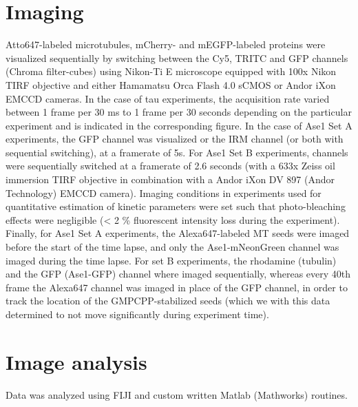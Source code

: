 \section{Imaging}
Atto647-labeled microtubules, mCherry- and mEGFP-labeled proteins were visualized sequentially by switching between the Cy5, TRITC and GFP channels (Chroma filter-cubes) using Nikon-Ti E microscope equipped with 100x Nikon TIRF objective and either Hamamatsu Orca Flash 4.0 sCMOS or Andor iXon EMCCD cameras. In the case of tau experiments, the acquisition rate varied between 1 frame per 30 ms to 1 frame per 30 seconds depending on the particular experiment and is indicated in the corresponding figure. In the case of Ase1 Set A experiments, the GFP channel was visualized or the IRM channel (or both with sequential switching), at a framerate of 5s. For Ase1 Set B experiments, channels were sequentially switched at a framerate of 2.6 seconds (with a 633x Zeiss oil immersion TIRF objective in combination with a Andor iXon DV 897 (Andor Technology) EMCCD camera). Imaging conditions in experiments used for quantitative estimation of kinetic parameters were set such that photo-bleaching effects were negligible (< 2 \% fluorescent intensity loss during the experiment). Finally, for Ase1 Set A experiments, the Alexa647-labeled MT seeds were imaged before the start of the time lapse, and only the Ase1-mNeonGreen channel was imaged during the time lapse. For set B experiments, the rhodamine (tubulin) and the GFP (Ase1-GFP) channel where imaged sequentially, whereas every 40th frame the Alexa647 channel was imaged in place of the GFP channel, in order to track the location of the GMPCPP-stabilized seeds (which we with this data determined to not move significantly during experiment time). 

\section{Image analysis}
\label{methods_analysis}
Data was analyzed using FIJI \parencite{Schindelin2012} and custom written Matlab (Mathworks) routines. 

